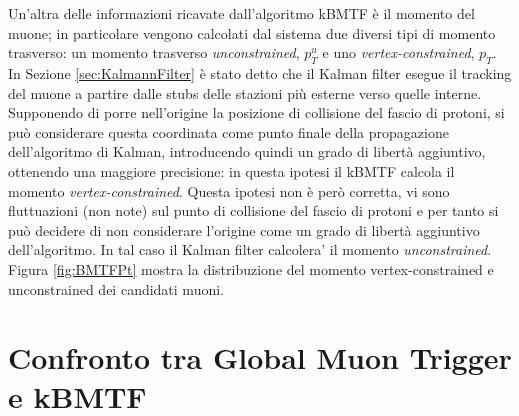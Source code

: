 Un'altra delle informazioni ricavate dall'algoritmo kBMTF è il momento del muone; in particolare vengono calcolati dal sistema due diversi tipi di momento trasverso: un momento trasverso \textit{unconstrained}, $p_T^u$ e uno \textit{vertex-constrained}, $p_T$. In Sezione \ref{sec:KalmannFilter} è stato detto che il Kalman filter esegue il tracking del muone a partire dalle stubs delle stazioni più esterne verso quelle interne. Supponendo di porre nell'origine la posizione di collisione del fascio di protoni, si può considerare questa coordinata come punto finale della propagazione dell'algoritmo di Kalman, introducendo quindi un grado di libertà aggiuntivo, ottenendo una maggiore precisione: in questa ipotesi il kBMTF calcola il momento \textit{vertex-constrained}. \newline
Questa ipotesi non è però corretta, vi sono fluttuazioni (non note) sul punto di collisione del fascio di protoni e per tanto si può decidere di non considerare l'origine come un grado di libertà aggiuntivo dell'algoritmo. In tal caso il Kalman filter calcolera' il momento \textit{unconstrained}. 
Figura \ref{fig:BMTFPt} mostra la distribuzione del momento vertex-constrained e unconstrained dei candidati muoni.








\section{Confronto tra Global Muon Trigger e kBMTF}

